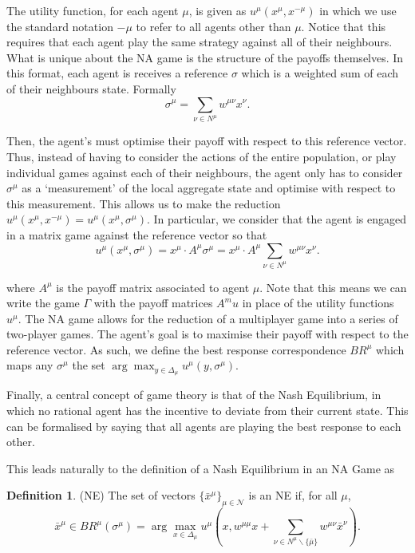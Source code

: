\documentclass{article}
\theoremstyle{definition}
\newtheorem{definition}{Definition}
\newcommand{\agentset}{\mathcal{N}}
\newcommand{\utility}[1]{u^{#1}}
\newcommand{\wmunu}{w^{\mu \nu}}
\newcommand{\xmu}{x^{\mu}}
\newcommand{\xnu}{x^{\nu}}
\newcommand{\refmu}{\sigma^{\mu}}
\newcommand{\NE}[1]{\bar{x}^{#1}}
\newcommand{\weightedsum}{ \sum_{\nu \in N^\mu} \wmunu \xnu}
\newcommand{\xnotmu}{x^{-\mu}}
\begin{document}
  The utility function, for each agent $\mu$, is given as $u^\mu(\xmu, \xnotmu)$ in which we use
  the standard notation $-\mu$ to refer to all agents other than $\mu$. Notice that this requires
  that each agent play the same strategy against all of their neighbours. What is unique about the
  NA game is the structure of the payoffs themselves. In this format, each agent is receives a
  reference $\sigma$ which is a weighted sum of each of their neighbours
  state. Formally
  \begin{equation}
    \sigma^\mu = \sum_{\nu \in N^\mu} \wmunu \xnu.
  \end{equation}

  Then, the agent's must optimise their payoff with respect to this reference vector. Thus,
  instead of having to consider the actions of the entire population, or play individual games
  against each of their neighbours, the agent only has to consider $\sigma^\mu$ as a
  `measurement' of the local aggregate state and optimise with respect to this measurement.
  This allows us to make the reduction $u^\mu(\xmu, \xnotmu) = u^\mu(\xmu, \refmu)$. In
  particular, we consider that the agent is engaged in a matrix game against the
  reference vector so that
  \begin{equation}
    u^\mu(\xmu, \refmu) = \xmu \cdot A^\mu \refmu = \xmu
                \cdot A^\mu \weightedsum.
  \end{equation}

  where $A^\mu$ is the payoff matrix associated to agent $\mu$. Note that this means we can write
  the game $\Gamma$ with the payoff matrices $A^mu$ in place of the utility functions
  $\utility{\mu}$. The NA game allows for the reduction of a multiplayer game into a series of
  two-player games. The agent's goal is to maximise their payoff with respect to the reference
  vector. As such, we define the best response correspondence $BR^\mu$ which maps any $\refmu$
  the set $\arg \max_{y \in \Delta_\mu} {u^\mu(y, \refmu)}$. 

  Finally, a central concept of game theory is that of the Nash Equilibrium, in which no rational
  agent has the incentive to deviate from their current state. This can be formalised by saying
  that all agents are playing the best response to each other.

  This leads naturally to the definition of a Nash Equilibrium in an NA Game as

  \begin{definition}(NE) \label{def::NE}
    The set of vectors $\{ \NE{\mu}\}_{\mu \in \agentset}$ is an NE if, for all $\mu$,  
    \begin{equation*}
    \NE{\mu} \in BR^\mu (\refmu) = \arg \max_{x \in \Delta_\mu} u^\mu(x, w^{\mu \mu} x + \sum_{\nu \in N^\mu \backslash \{\bar{\mu}\}} \wmunu \NE{\nu}).
    \end{equation*} 
  \end{definition}
    
\end{document}
